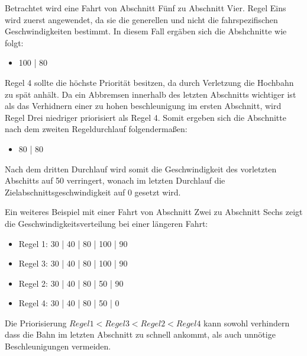 Betrachtet wird eine Fahrt von Abschnitt Fünf zu Abschnitt Vier. Regel Eins wird zuerst angewendet, da sie die generellen und nicht die fahrspezifischen Geschwindigkeiten bestimmt. In diesem Fall ergäben sich die Abshchnitte wie folgt:

\begin{center}
	\begin{itemize}
		\item 100 | 80
	\end{itemize}
\end{center}

Regel 4 sollte die höchste Priorität besitzen, da durch Verletzung die Hochbahn zu spät anhält. Da ein Abbremsen innerhalb des letzten Abschnitts wichtiger ist als das Verhidnern einer zu hohen beschleunigung im ersten Abschnitt, wird Regel Drei niedriger priorisiert als Regel 4. Somit ergeben sich die Abschnitte nach dem zweiten Regeldurchlauf folgendermaßen:

\begin{center}
	\begin{itemize}
		\item 80 | 80
	\end{itemize}
\end{center}

Nach dem dritten Durchlauf wird somit die Geschwindigkeit des vorletzten Abschitts auf 50 verringert, wonach im letzten Durchlauf die Zielabschnittsgeschwindigkeit auf 0 gesetzt wird. 

Ein weiteres Beispiel mit einer Fahrt von Abschnitt Zwei zu Abschnitt Sechs zeigt die Geschwindigkeitsverteilung bei einer längeren Fahrt:

\begin{center}
	\begin{itemize}
		\item Regel 1: 30 | 40 | 80 | 100 | 90 
		\item Regel 3: 30 | 40 | 80 | 100 | 90 
		\item Regel 2: 30 | 40 | 80 |  50 | 90 
		\item Regel 4: 30 | 40 | 80 |  50 |  0 
	\end{itemize}
\end{center}

Die Priorisierung $Regel1 <  Regel3 <  Regel2  < Regel4$ kann  sowohl verhindern dass die Bahn im letzten Abschnitt zu schnell ankommt, als auch unnötige Beschleunigungen vermeiden.

